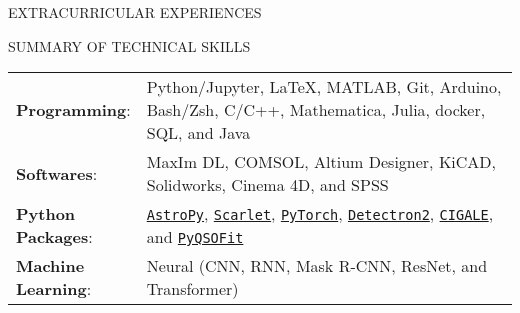 \documentclass[10pt]{article} %
\begin{document}
\begin{section}{EXTRACURRICULAR EXPERIENCES}

\end{section}

\begin{section}{SUMMARY OF TECHNICAL SKILLS}

\begin{tabular}{@{}p{0.2\linewidth}@{}p{0.8\linewidth}@{}}
    \textbf{Programming}: & Python/Jupyter, \LaTeX, MATLAB, Git, Arduino, Bash/Zsh, C/C++, Mathematica, Julia, docker, SQL, and Java \\
    \textbf{Softwares}: & MaxIm DL, COMSOL, Altium Designer, KiCAD, Solidworks, Cinema 4D, and SPSS \\
    \textbf{Python Packages}: & \href{https://www.astropy.org/}{\texttt{AstroPy}}, \href{https://github.com/pmelchior/scarlet}{\texttt{Scarlet}}, \href{https://pytorch.org/}{\texttt{PyTorch}}, \href{https://github.com/facebookresearch/detectron2}{\texttt{Detectron2}}, \href{https://cigale.lam.fr/}{\texttt{CIGALE}}, and \href{https://github.com/legolason/PyQSOFit}{\texttt{PyQSOFit}} \\
    \textbf{Machine Learning}: & Neural (CNN, RNN, Mask R-CNN, ResNet, and Transformer) \\
\end{tabular}
    
    \end{section} 
\end{document}
